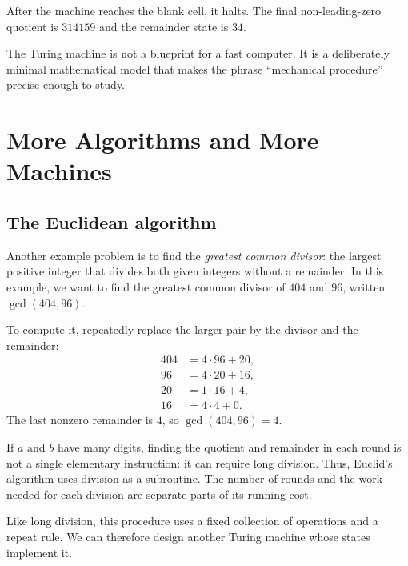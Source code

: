 \documentclass[11pt]{article}
\begin{document}
After the machine reaches the blank cell, it halts. The final non-leading-zero quotient is $314159$ and the remainder state is $34$.

\begin{keyidea}
The Turing machine is not a blueprint for a fast computer. It is a deliberately minimal mathematical model that makes the phrase ``mechanical procedure'' precise enough to study.
\end{keyidea}

\section{More Algorithms and More Machines}

\subsection{The Euclidean algorithm}

Another example problem is to find the \emph{greatest common divisor}: the largest
positive integer that divides both given integers without a remainder. In this
example, we want to find the greatest common divisor of $404$ and $96$, written
$\gcd(404,96)$.

To compute it, repeatedly replace the larger pair by the divisor and the remainder:
\begin{align*}
404 &= 4\cdot96+20,\\
 96 &= 4\cdot20+16,\\
 20 &= 1\cdot16+4,\\
 16 &= 4\cdot4+0.
\end{align*}
The last nonzero remainder is $4$, so $\gcd(404,96)=4$.

If $a$ and $b$ have many digits, finding the quotient and remainder in each
round is not a single elementary instruction: it can require long division.
Thus, Euclid's algorithm uses division as a subroutine. The number of rounds
and the work needed for each division are separate parts of its running cost.

Like long division, this procedure uses a fixed collection of operations and a
repeat rule. We can therefore design another Turing machine whose states
implement it.
\end{document}

